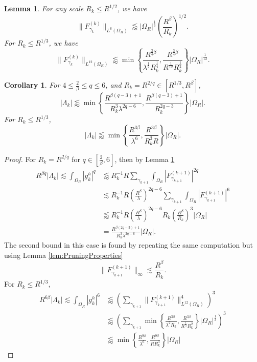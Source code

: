 \documentclass[10pt,a4paper]{amsart}
\newtheorem{lemma}{Lemma}
\newtheorem{corollary}{Corollary}
\begin{document}
\begin{lemma}\label{lem:L6andL12estimates}
 For any scale $R_k\le R^{1/2}$, we have
    $$\|F_{\gamma_k}^{(k)}\|_{L^{6}(\Omega_R)}\lessapprox |\Omega_R|^{\frac{1}{6}}\left(\frac{R^{\beta}}{R_k}\right)^{1/2}.$$
 For $R_k\le R^{1/3}$, we have $$\|F_{\gamma_k}^{(k)}\|_{L^{12}(\Omega_R)}\lessapprox \min \left\{\frac{R^{\frac{3}{4}\beta}}{\lambda^{\frac{1}{2}}R_k^{\frac{1}{4}}}, \frac{R^{\frac{3}{4}\beta}}{R^{\frac{1}{12}}R_k^{\frac{1}{2}}}\right\}|\Omega_R|^{\frac{1}{12}}.$$ 
\end{lemma}

\begin{corollary}\label{cor:Lambda_kEstimate}
    For $4\le \frac{2}{\beta}\le q\le 6$, and $R_k=R^{2/q}\in [R^{1/3}, R^{\beta}]$, 
    $$|\Lambda_k|\lessapprox\min\left\{\frac{R^{\beta(q-3)+1}}{R_k^3\lambda^{2q-6}}, \frac{R^{\beta(q-3)+1}}{R_k^{2q-3}}\right\}|\Omega_R|.$$ For $R_k\le R^{1/3}$, $$|\Lambda_k|\lessapprox \min\left\{\frac{R^{3\beta}}{\lambda^6}, \frac{R^{3\beta}}{R_k^3R}\right\}|\Omega_R|.$$
\end{corollary}

\begin{proof}
For $R_k= R^{2/q}$ for $q\in [\frac{2}{\beta},6]$, then by Lemma \ref{lem:L6andL12estimates}\begin{align*}
    R^{\beta q}|\Lambda_k|\lesssim\int_{\Omega_R}|g_k^h|^q&\lessapprox R_k^{-1}R \sum_{\gamma_{k+1}}\int_{\Omega_R} |F_{\gamma_{k+1}}^{(k+1)}|^{2q}\\
    &\lesssim R_k^{-1}R\left(\frac{R^\beta}{\lambda}\right)^{2q-6}\sum_{\gamma_{k+1}}\int_{\Omega_R}|F_{\gamma_{k+1}}^{(k+1)}|^{6}\\
    &\lessapprox R_k^{-1}R \left(\frac{R^\beta}{\lambda}\right)^{2q-6} R_k\left(\frac{R^{\beta}}{R_k}\right)^3|\Omega_R|\\
    &= \frac{R^{\beta(2q-3)+1}}{R_k^3\lambda^{2q-6}}|\Omega_R|.
\end{align*} The second bound in this case is found by repeating the same computation but using Lemma \ref{lem:PruningProperties} $$\|F_{\gamma_{k+1}}^{(k+1)}\|_\infty \lesssim \frac{R^{\beta}}{R_k}.$$
%
For $R_k\le R^{1/3}$, \begin{align*}
    R^{6\beta}|\Lambda_k|\lesssim\int_{\Omega_R}|g_k^h|^6&\lessapprox \left(\sum_{\gamma_{k+1}}\|F_{\gamma_{k+1}}^{(k+1)}\|_{L^{12}(\Omega_R)}^4\right)^3\\
    &\lessapprox  \left(\sum_{\gamma_{k+1}}\min \left\{\frac{R^{3\beta}}{\lambda^2R_k}, \frac{R^{3\beta}}{R^{\frac{1}{3}}R_k^2}\right\}|\Omega_R|^{\frac{1}{3}}\right)^3\\
    &\lessapprox \min \left\{\frac{R^{9\beta}}{\lambda^6}, \frac{R^{9\beta}}{RR_k^3}\right\}|\Omega_R|
\end{align*}

\end{proof}
\end{document}
